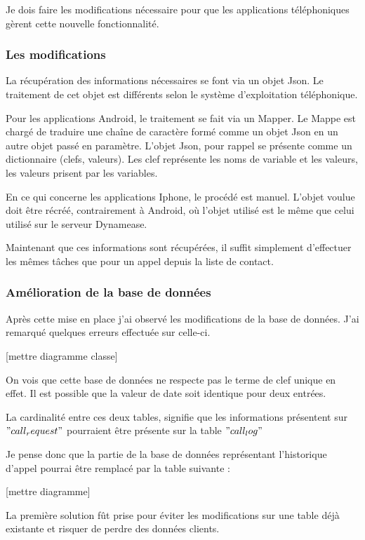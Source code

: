 Je dois faire les modifications nécessaire pour que les applications téléphoniques gèrent cette nouvelle fonctionnalité.

\subsubsection{Les modifications}

La récupération des informations nécessaires se font via un objet Json. Le traitement de cet objet est différents selon le système d'exploitation téléphonique.

Pour les applications Android, le traitement se fait via un Mapper. Le Mappe est chargé de traduire une chaîne de caractère formé comme un objet Json en un autre objet passé en paramètre. L'objet Json, pour rappel se présente comme un dictionnaire (clefs, valeurs). Les clef représente les noms de variable et les valeurs, les valeurs prisent par les variables.

En ce qui concerne les applications Iphone, le procédé est manuel. L'objet voulue doit être récréé, contrairement à Android, où l'objet utilisé est le même que celui utilisé sur le serveur Dynamease. 

Maintenant que ces informations sont récupérées, il suffit simplement d'effectuer les mêmes tâches que pour un appel depuis la liste de contact.

\subsubsection{Amélioration de la base de données}

Après cette mise en place j'ai observé les modifications de la base de données. J'ai remarqué quelques erreurs effectuée sur celle-ci.

[mettre diagramme classe]

On vois que cette base de données ne respecte pas le terme de clef unique en effet. Il est possible que la valeur de date soit identique pour deux entrées.

La cardinalité entre ces deux tables, signifie que les informations présentent sur $"call_request"$ pourraient être présente sur la table $"call_log"$

Je pense donc que la partie de la base de données représentant l'historique d'appel pourrai être remplacé par la table suivante :

[mettre diagramme]

La première solution fût prise pour éviter les modifications sur une table déjà existante et risquer de perdre des données clients. 